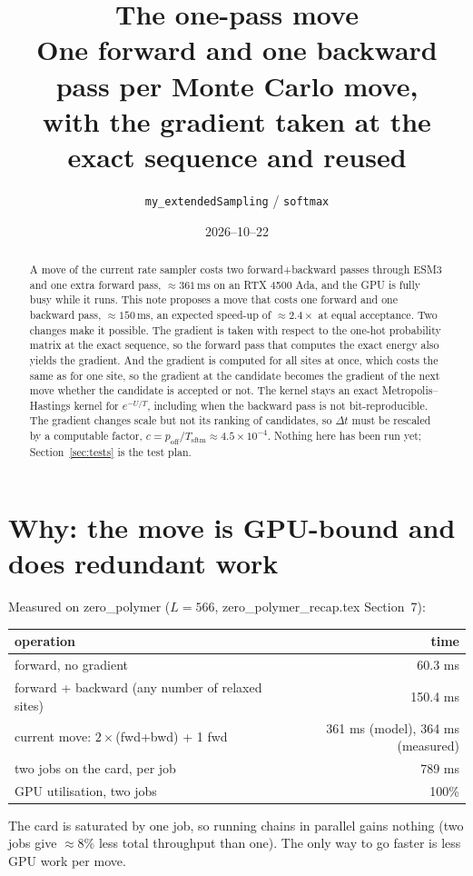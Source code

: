 \documentclass[11pt,a4paper]{article}
\title{The one-pass move\\
       \large One forward and one backward pass per Monte Carlo move,\\
       with the gradient taken at the exact sequence and reused}
\author{\texttt{my\_extendedSampling} / \texttt{softmax}}
\date{2026--10--22}
\newcommand{\dt}{\Delta t}
\newcommand{\Tsftm}{T_{\mathrm{sftm}}}
\begin{document}
\maketitle

\begin{abstract}
\noindent
A move of the current rate sampler costs two forward+backward passes through
ESM3 and one extra forward pass, $\approx361$\,ms on an RTX 4500 Ada, and the
GPU is fully busy while it runs. This note proposes a move that costs one
forward and one backward pass, $\approx150$\,ms, an expected speed-up of
$\approx2.4\times$ at equal acceptance. Two changes make it possible. The
gradient is taken with respect to the one-hot probability matrix at the exact
sequence, so the forward pass that computes the exact energy also yields the
gradient. And the gradient is computed for all sites at once, which costs the
same as for one site, so the gradient at the candidate becomes the gradient
of the next move whether the candidate is accepted or not. The kernel stays an
exact Metropolis--Hastings kernel for $e^{-U/T}$, including when the backward
pass is not bit-reproducible. The gradient changes scale but not its ranking of
candidates, so $\dt$ must be rescaled by a computable factor,
$c=p_{\mathrm{off}}/\Tsftm\approx4.5\times10^{-4}$. Nothing here has been run
yet; Section~\ref{sec:tests} is the test plan.
\end{abstract}

\tableofcontents

\section{Why: the move is GPU-bound and does redundant work}
Measured on zero\_polymer ($L=566$, zero\_polymer\_recap.tex Section~7):
\begin{center}
\begin{tabular}{@{}lr@{}}
\toprule
operation & time \\
\midrule
forward, no gradient                    & 60.3 ms \\
forward + backward (any number of relaxed sites) & 150.4 ms \\
current move: $2\times$(fwd+bwd) + 1 fwd & 361 ms (model), 364 ms (measured) \\
two jobs on the card, per job            & 789 ms \\
GPU utilisation, two jobs                & 100\% \\
\bottomrule
\end{tabular}
\end{center}
The card is saturated by one job, so running chains in parallel gains nothing
(two jobs give $\approx8\%$ less total throughput than one). The only way to go
faster is less GPU work per move.
\end{document}
